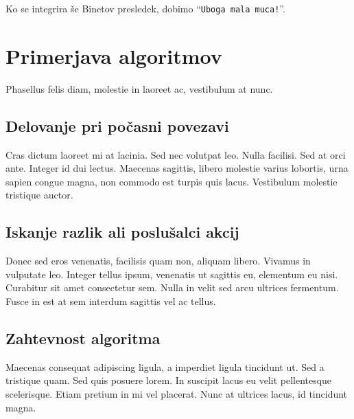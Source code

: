 \documentclass[a4paper, 12pt, twoside]{book}
\begin{document}
Ko se integrira še Binetov presledek, dobimo “{\tt Uboga mala muca!}”.

\chapter{Primerjava algoritmov}

Phasellus felis diam, molestie in laoreet ac, vestibulum at nunc.

\section{Delovanje pri počasni povezavi}

Cras dictum laoreet mi at lacinia. Sed nec volutpat leo. Nulla facilisi. Sed at orci ante. Integer id dui lectus. Maecenas sagittis, libero molestie varius lobortis, urna sapien congue magna, non commodo est turpis quis lacus. Vestibulum molestie tristique auctor.

\section{Iskanje razlik ali poslušalci akcij}

Donec sed eros venenatis, facilisis quam non, aliquam libero. Vivamus in vulputate leo. Integer tellus ipsum, venenatis ut sagittis eu, elementum eu nisi. Curabitur sit amet consectetur sem. Nulla in velit sed arcu ultrices fermentum. Fusce in est at sem interdum sagittis vel ac tellus.

\section{Zahtevnost algoritma}

Maecenas consequat adipiscing ligula, a imperdiet ligula tincidunt ut. Sed a tristique quam. Sed quis posuere lorem. In suscipit lacus eu velit pellentesque scelerisque. Etiam pretium in mi vel placerat. Nunc at ultrices lacus, id tincidunt magna.

\end{document}
